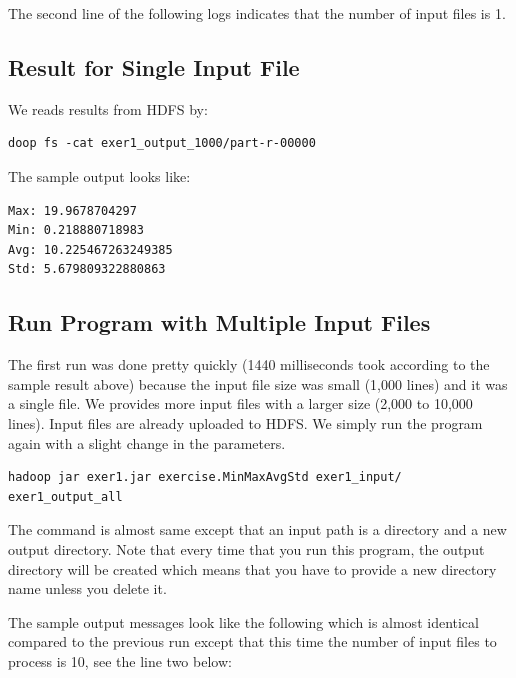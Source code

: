The second line of the following logs indicates that the number of
input files is 1.

\subsection{Result for Single Input File}

We reads results from HDFS by:

\begin{lstlisting}
doop fs -cat exer1_output_1000/part-r-00000
\end{lstlisting}

The sample output looks like:

\begin{lstlisting}
Max: 19.9678704297
Min: 0.218880718983
Avg: 10.225467263249385
Std: 5.679809322880863
\end{lstlisting}

\subsection{Run Program with Multiple Input Files}

The first run was done pretty quickly (1440 milliseconds took
according to the sample result above) because the input file size was
small (1,000 lines) and it was a single file. We provides more input
files with a larger size (2,000 to 10,000 lines). Input files are
already uploaded to HDFS. We simply run the program again with a
slight change in the parameters.

\begin{lstlisting}
hadoop jar exer1.jar exercise.MinMaxAvgStd exer1_input/ exer1_output_all
\end{lstlisting}

The command is almost same except that an input path is a directory
and a new output directory. Note that every time that you run this
program, the output directory will be created which means that you
have to provide a new directory name unless you delete it.

The sample output messages look like the following which is almost
identical compared to the previous run except that this time the
number of input files to process is 10, see the line two below:

